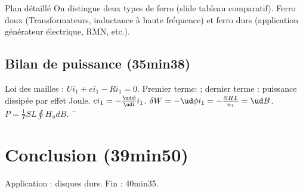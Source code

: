 \begin{reportBlock}{Plan détaillé}
On distingue deux types de ferro (slide tableau comparatif). Ferro doux (Transformateurs, inductance à haute fréquence) et ferro durs (application générateur électrique, RMN, etc.).

\subsection{Bilan de puissance (35min38)}

Loi des mailles : $U i_1 + e i_1 - R i_1 = 0$. Premier terme: ; dernier terme : puissance dissipée par effet Joule. $e i_1 = - \frac{\ud \phi}{\ud t} i_1$. $\delta W = - \ud \phi i_1 = - \frac{SHL}{n_1} = \ud B$. $P = \frac{1}{T} SL \oint H _ud B$. ¨

\section*{Conclusion (39min50)}

Application : disques durs.
Fin : 40min35.

\end{reportBlock}


